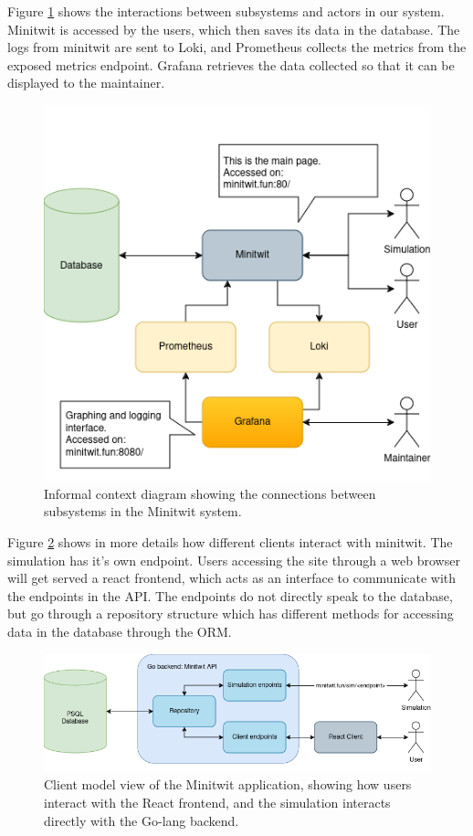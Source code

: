 Figure \ref{fig:Informal context diagram} shows the interactions between subsystems and actors in our system. Minitwit is accessed by the users, which then saves its data in the database. The logs from minitwit are sent to Loki, and Prometheus collects the metrics from the exposed metrics endpoint. Grafana retrieves the data collected so that it can be displayed to the maintainer.
\begin{figure}[H]
    \centering
    \includegraphics[scale=.7]{diagrams/context_diagram.png}
    \caption{Informal context diagram showing the connections between subsystems in the Minitwit system.}
    \label{fig:Informal context diagram}
\end{figure}

Figure \ref{fig:client_model_view} shows in more details how different clients interact with minitwit. The simulation has it's own endpoint. Users accessing the site through a web browser will get served a react frontend, which acts as an interface to communicate with the endpoints in the API. The endpoints do not directly speak to the database, but go through a repository structure which has different methods for accessing data in the database through the ORM.
\begin{figure}[H]
    \centering
    \includegraphics[width=\textwidth]{diagrams/Client_model_view.png}
    \caption{Client model view of the Minitwit application, showing how users interact with the React frontend, and the simulation interacts directly with the Go-lang backend.}
    \label{fig:client_model_view}
\end{figure}

